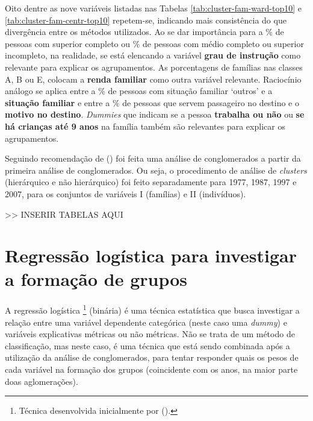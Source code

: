 Oito dentre as nove variáveis listadas nas Tabelas  \ref{tab:cluster-fam-ward-top10} e \ref{tab:cluster-fam-centr-top10} repetem-se, indicando mais consistência do que divergência entre os métodos utilizados. Ao se dar importância para a \% de pessoas com superior completo ou \% de pessoas com médio completo ou superior incompleto, na realidade, se está elencando a variável \textbf{grau de instrução} como relevante para explicar os agrupamentos. As porcentagens de famílias nas classes A, B ou E, colocam a \textbf{renda familiar} como outra variável relevante.
Raciocínio análogo se aplica entre a \% de pessoas com situação familiar `outros' e a \textbf{situação familiar} e entre a \% de pessoas que servem passageiro no destino e o \textbf{motivo no destino}.
\textit{Dummies} que indicam se a pessoa \textbf{trabalha ou não} ou \textbf{se há crianças até 9 anos} na família também são relevantes para explicar os agrupamentos.

Seguindo recomendação de  (\citeyear{VESPUCCI2003}) foi feita uma análise de conglomerados a partir da primeira análise de conglomerados. Ou seja, o procedimento de análise de \textit{clusters} (hierárquico e não hierárquico) foi feito separadamente para 1977, 1987, 1997 e 2007, para os conjuntos de variáveis I (famílias) e II (indivíduos).


>> INSERIR TABELAS AQUI

 \clearpage
\section{Regressão logística para investigar a formação de grupos}\label{sec:analises-reg-log}

A regressão logística
\footnote{Técnica desenvolvida inicialmente por  (\citeyear{COX1958}).}
 (binária) é uma técnica estatística que busca investigar a relação entre uma variável dependente categórica (neste caso uma \textit{dummy}) e variáveis explicativas métricas ou não métricas. Não se trata de um método de classificação, mas neste caso, é uma técnica que está sendo combinada após a utilização da análise de conglomerados, para tentar responder quais os pesos de cada variável na formação dos grupos (coincidente com os anos, na maior parte doas aglomerações).

